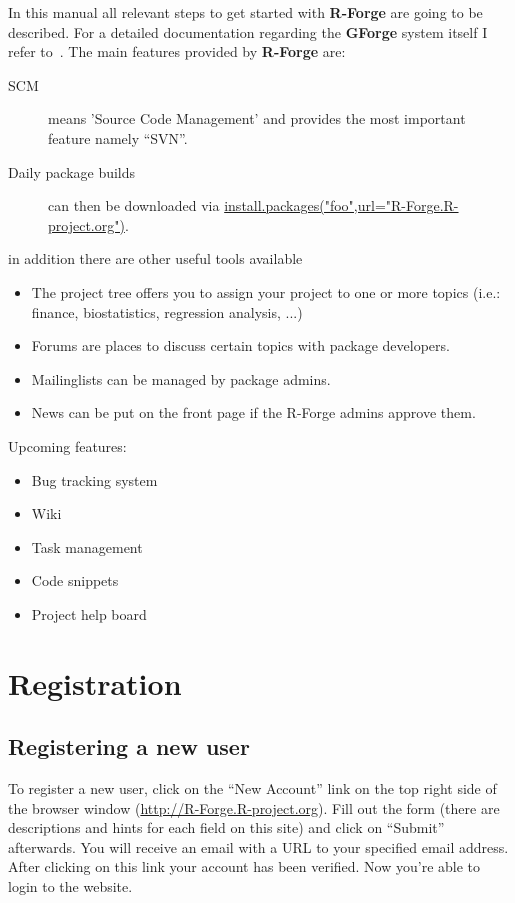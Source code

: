 \documentclass[a4paper]{article}
\begin{document}
In this manual all relevant steps to get
started with \textbf{R-Forge} are going to be described. For a detailed
documentation regarding the \textbf{GForge} system itself I refer
to~\cite{manual:gforge}.\newline
\newline
The main features provided by \textbf{R-Forge} are:
\begin{description}
\item[SCM] means 'Source Code Management' and provides the most
  important feature namely ``SVN''.
\item[Daily package builds] can then be downloaded via\newline
  \url{install.packages("foo",url="R-Forge.R-project.org")}.
\end{description}
in addition there are other useful tools available
\begin{itemize}
\item The project tree offers you to assign your project to one or more
  topics (i.e.: finance, biostatistics, regression analysis, ...)
\item Forums are places to discuss certain topics with package
  developers.
\item Mailinglists can be managed by package admins.
\item News can be put on the front page if the R-Forge admins approve
  them.
\end{itemize}
Upcoming features:
\begin{itemize}
\item Bug tracking system
\item Wiki
\item Task management
\item Code snippets
\item Project help board
\end{itemize}

\section{Registration}
\label{sec:registration}

\subsection{Registering a  new user}

To register a new user, click on the ``New Account'' link on the top
right side of the browser window (\url{http://R-Forge.R-project.org}).
Fill out the form (there are descriptions and hints for each field on
this site) and click on ``Submit'' afterwards. You will receive an
email with
a URL to your specified email address. After clicking on this link
your account has been verified. Now you're able to login to the
website.
\newline
\end{document}
